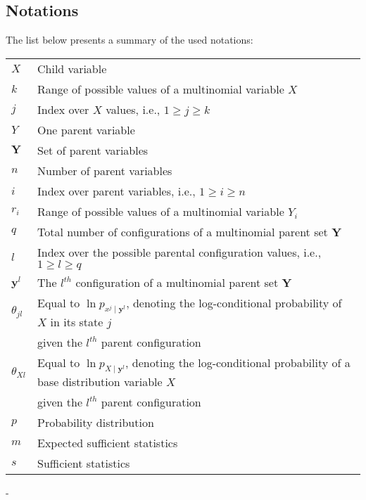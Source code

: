 \documentclass[11pt, oneside]{article}   	%
\numberwithin{figure}{section}
\numberwithin{equation}{section}
\numberwithin{table}{section}
\theoremstyle{definition}
\begin{document}
\begin{appendices}
\newpage
\section*{Notations}

The list below presents a summary of the used notations:
\\

\begin{table}[ht!]
\renewcommand{\arraystretch}{1.1}
{\small
\begin{tabular}{l l}
$X$ & Child variable\\
$k$& Range of possible values of a multinomial variable $X$\\
$j$ & Index over $X$ values, i.e., $1 \geq j \geq k$ \\
$Y$ & One parent variable\\
$\mathbf{Y}$ & Set of parent variables\\
$n$& Number of parent variables \\
$i$ & Index over parent variables, i.e., $1 \geq i \geq n$ \\
$r_i$& Range of possible values of a multinomial variable $Y_i$\\
$q $ & Total number of configurations of a multinomial parent set $\mathbf{Y}$\\
$l$ & Index over the possible parental configuration values, i.e., $1 \geq l \geq q$ \\
$\mathbf{y}^l$ & The $l^{th}$ configuration of a multinomial parent set $\mathbf{Y}$\\
$\theta_{jl}$ & Equal to $\ln p_{x^j\mid \mathbf{y}^l}$, denoting the log-conditional probability of $X$ in its state $j$ \\
                    & given the $l^{th}$ parent configuration\\
$\theta_{Xl}$ & Equal to $\ln p_{ X \mid \mathbf{y}^l}$, denoting the log-conditional probability of a base distribution variable $X$ \\
                    & given the $l^{th}$ parent configuration\\
$p$ & Probability distribution\\
$m$ & Expected sufficient statistics \\
$s$ & Sufficient statistics \\
\end{tabular}}
\end{table}
-

\end{appendices}



\end{document}
